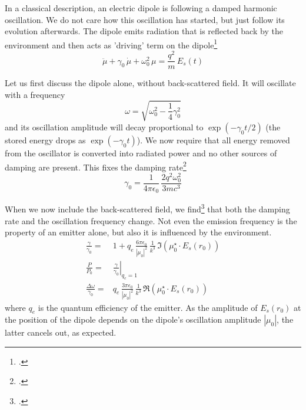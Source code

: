 In a classical description,  an electric dipole is following a damped harmonic oscillation. We do not care how this oscillation has started, but just follow its evolution afterwards. The dipole emits radiation that is reflected back by the environment and then acts as 'driving' term on the dipole\footcite[chapter 8.5.2]{Novotny-Hecht2012}
\begin{equation}
 \ddot{\mu} + \gamma_0 \, \dot{\mu} + \omega_0^2 \, \mu = \frac{q^2}{m} \, E_s(t)
\end{equation}

Let us first discuss the dipole alone, without back-scattered field. It will oscillate with a frequency
\begin{equation}
 \omega = \sqrt{\omega_0 ^2 - \frac{1}{4} \gamma_0^2}
\end{equation}
and its oscillation amplitude will decay proportional to $\exp(- \gamma_0 t /2)$ (the stored energy drops as $\exp( - \gamma_0 t)$). We now require that all energy removed from the oscillator is converted into radiated power and no other sources of damping are present. This fixes the damping rate\footcite{Novotny-Hecht2012}
\begin{equation}
\gamma_0 = \frac{1}{4  \pi  \epsilon_0} \, \frac{2 q^2 \omega_0^2}{3 m c^3}
\end{equation}

When we now include the back-scattered field, we find\footcite[chapter 8.5.2]{Novotny-Hecht2012} that both the damping rate and the oscillation frequency change. Not even the emission frequency is the property of an emitter alone, but also it is influenced by the environment.
\begin{eqnarray}
 \frac{\gamma}{\gamma_0}  = &
  1 +  q_e \, \frac{6 \pi \epsilon_0}{|\mu_0|^2} \, \frac{1}{k^3} 
  \, \Im \left( \mu_0^\star \cdot E_s(r_0) \right) \\
 \frac{P}{P_0} =  &  \left. \frac{\gamma}{\gamma_0}  \right|_{q_e = 1} \\
 \frac{\Delta \omega}{\gamma_0} = &
 q_e \, \frac{3 \pi \epsilon_0}{|\mu_0|^2} \, \frac{1}{k^3} 
  \, \Re \left( \mu_0^\star \cdot E_s(r_0) \right)
\end{eqnarray}
where $q_e$ is the quantum efficiency of the emitter.
As the amplitude of $ E_s(r_0)$ at the position of the dipole depends on the dipole's oscillation amplitude $|\mu_0|$, the latter cancels out, as expected.

